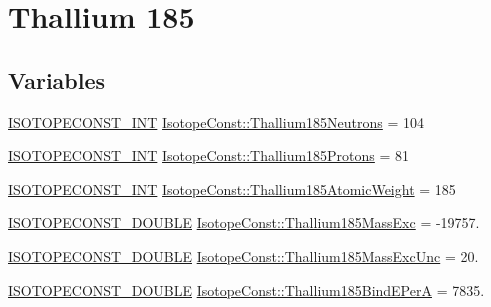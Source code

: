 \hypertarget{group___isotope_const-_thallium-_tl185}{}\section{Thallium 185}
\label{group___isotope_const-_thallium-_tl185}
\subsection*{Variables}
\begin{DoxyCompactItemize}
\item 
\mbox{\hyperlink{group___isotope_const-_macros_ga5f18360b3e99483a35c32d789e62621c}{I\+S\+O\+T\+O\+P\+E\+C\+O\+N\+S\+T\+\_\+\+I\+NT}} \mbox{\hyperlink{group___isotope_const-_thallium-_tl185_ga018c7830dd4a3e540fa078a5c4d35a7c}{Isotope\+Const\+::\+Thallium185\+Neutrons}} = 104
\item 
\mbox{\hyperlink{group___isotope_const-_macros_ga5f18360b3e99483a35c32d789e62621c}{I\+S\+O\+T\+O\+P\+E\+C\+O\+N\+S\+T\+\_\+\+I\+NT}} \mbox{\hyperlink{group___isotope_const-_thallium-_tl185_gafb7b53f90c8687c62ab5320d061ac28e}{Isotope\+Const\+::\+Thallium185\+Protons}} = 81
\item 
\mbox{\hyperlink{group___isotope_const-_macros_ga5f18360b3e99483a35c32d789e62621c}{I\+S\+O\+T\+O\+P\+E\+C\+O\+N\+S\+T\+\_\+\+I\+NT}} \mbox{\hyperlink{group___isotope_const-_thallium-_tl185_gadfc4b5176fb15d0f3a785b2407799f92}{Isotope\+Const\+::\+Thallium185\+Atomic\+Weight}} = 185
\item 
\mbox{\hyperlink{group___isotope_const-_macros_ga8f45a7272ce02c0b4c65c44636ed719a}{I\+S\+O\+T\+O\+P\+E\+C\+O\+N\+S\+T\+\_\+\+D\+O\+U\+B\+LE}} \mbox{\hyperlink{group___isotope_const-_thallium-_tl185_ga2afceab4492bc2c6c90197f76bd95cc9}{Isotope\+Const\+::\+Thallium185\+Mass\+Exc}} = -\/19757.
\item 
\mbox{\hyperlink{group___isotope_const-_macros_ga8f45a7272ce02c0b4c65c44636ed719a}{I\+S\+O\+T\+O\+P\+E\+C\+O\+N\+S\+T\+\_\+\+D\+O\+U\+B\+LE}} \mbox{\hyperlink{group___isotope_const-_thallium-_tl185_ga60a43e0866fbbe63e34d33f53aff663b}{Isotope\+Const\+::\+Thallium185\+Mass\+Exc\+Unc}} = 20.
\item 
\mbox{\hyperlink{group___isotope_const-_macros_ga8f45a7272ce02c0b4c65c44636ed719a}{I\+S\+O\+T\+O\+P\+E\+C\+O\+N\+S\+T\+\_\+\+D\+O\+U\+B\+LE}} \mbox{\hyperlink{group___isotope_const-_thallium-_tl185_ga760803441eefcc62536a66a1279fb491}{Isotope\+Const\+::\+Thallium185\+Bind\+E\+PerA}} = 7835.
\item 

\end{DoxyCompactItemize}
